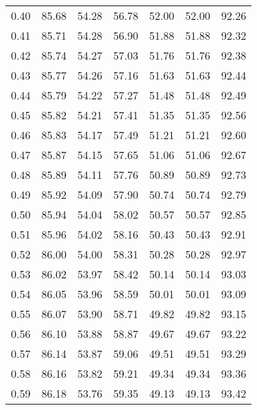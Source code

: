 \begin{tabular}{|c|c|c|c|c|c|c|}
      0.40 &     85.68 &     54.28 &      56.78 &   52.00 &      52.00 &         92.26 \\
      0.41 &     85.71 &     54.28 &      56.90 &   51.88 &      51.88 &         92.32 \\
      0.42 &     85.74 &     54.27 &      57.03 &   51.76 &      51.76 &         92.38 \\
      0.43 &     85.77 &     54.26 &      57.16 &   51.63 &      51.63 &         92.44 \\
      0.44 &     85.79 &     54.22 &      57.27 &   51.48 &      51.48 &         92.49 \\
      0.45 &     85.82 &     54.21 &      57.41 &   51.35 &      51.35 &         92.56 \\
      0.46 &     85.83 &     54.17 &      57.49 &   51.21 &      51.21 &         92.60 \\
      0.47 &     85.87 &     54.15 &      57.65 &   51.06 &      51.06 &         92.67 \\
      0.48 &     85.89 &     54.11 &      57.76 &   50.89 &      50.89 &         92.73 \\
      0.49 &     85.92 &     54.09 &      57.90 &   50.74 &      50.74 &         92.79 \\
      0.50 &     85.94 &     54.04 &      58.02 &   50.57 &      50.57 &         92.85 \\
      0.51 &     85.96 &     54.02 &      58.16 &   50.43 &      50.43 &         92.91 \\
      0.52 &     86.00 &     54.00 &      58.31 &   50.28 &      50.28 &         92.97 \\
      0.53 &     86.02 &     53.97 &      58.42 &   50.14 &      50.14 &         93.03 \\
      0.54 &     86.05 &     53.96 &      58.59 &   50.01 &      50.01 &         93.09 \\
      0.55 &     86.07 &     53.90 &      58.71 &   49.82 &      49.82 &         93.15 \\
      0.56 &     86.10 &     53.88 &      58.87 &   49.67 &      49.67 &         93.22 \\
      0.57 &     86.14 &     53.87 &      59.06 &   49.51 &      49.51 &         93.29 \\
      0.58 &     86.16 &     53.82 &      59.21 &   49.34 &      49.34 &         93.36 \\
      0.59 &     86.18 &     53.76 &      59.35 &   49.13 &      49.13 &         93.42 \\

\end{tabular}
